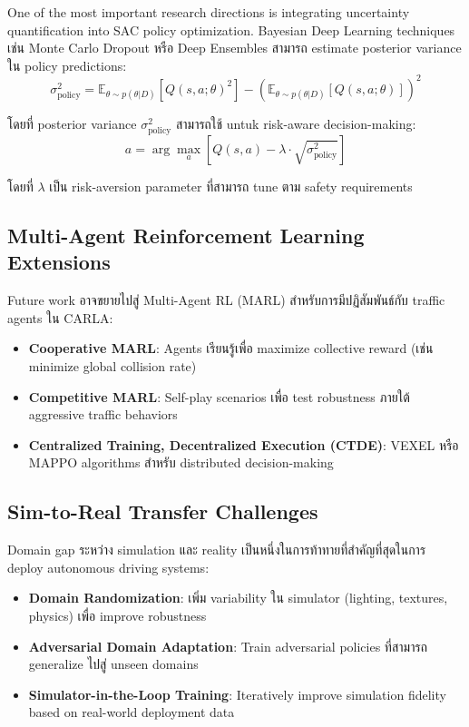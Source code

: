 \documentclass[10pt,a4paper,twocolumn]{article}
\begin{document}
One of the most important research directions is integrating uncertainty quantification into SAC policy optimization. Bayesian Deep Learning techniques เช่น Monte Carlo Dropout หรือ Deep Ensembles สามารถ estimate posterior variance ใน policy predictions:
\begin{equation}
    \sigma^2_{\text{policy}} = \mathbb{E}_{\theta \sim p(\theta|D)} [Q(s,a;\theta)^2] - (\mathbb{E}_{\theta \sim p(\theta|D)} [Q(s,a;\theta)])^2
\end{equation}

โดยที่ posterior variance $\sigma^2_{\text{policy}}$ สามารถใช้ untuk risk-aware decision-making:
\begin{equation}
    a = \arg\max_a \left[ Q(s,a) - \lambda \cdot \sqrt{\sigma^2_{\text{policy}}} \right]
\end{equation}

โดยที่ $\lambda$ เป็น risk-aversion parameter ที่สามารถ tune ตาม safety requirements

\subsection{Multi-Agent Reinforcement Learning Extensions}

Future work อาจขยายไปสู่ Multi-Agent RL (MARL) สำหรับการมีปฏิสัมพันธ์กับ traffic agents ใน CARLA:
\begin{itemize}
    \item \textbf{Cooperative MARL}: Agents เรียนรู้เพื่อ maximize collective reward (เช่น minimize global collision rate)
    
    \item \textbf{Competitive MARL}: Self-play scenarios เพื่อ test robustness ภายใต้ aggressive traffic behaviors
    
    \item \textbf{Centralized Training, Decentralized Execution (CTDE)}: VEXEL หรือ MAPPO algorithms สำหรับ distributed decision-making
\end{itemize}

\subsection{Sim-to-Real Transfer Challenges}

Domain gap ระหว่าง simulation และ reality เป็นหนึ่งในการท้าทายที่สำคัญที่สุดในการ deploy autonomous driving systems:
\begin{itemize}
    \item \textbf{Domain Randomization}: เพิ่ม variability ใน simulator (lighting, textures, physics) เพื่อ improve robustness
    
    \item \textbf{Adversarial Domain Adaptation}: Train adversarial policies ที่สามารถ generalize ไปสู่ unseen domains
    
    \item \textbf{Simulator-in-the-Loop Training}: Iteratively improve simulation fidelity based on real-world deployment data
\end{itemize}
\end{document}
